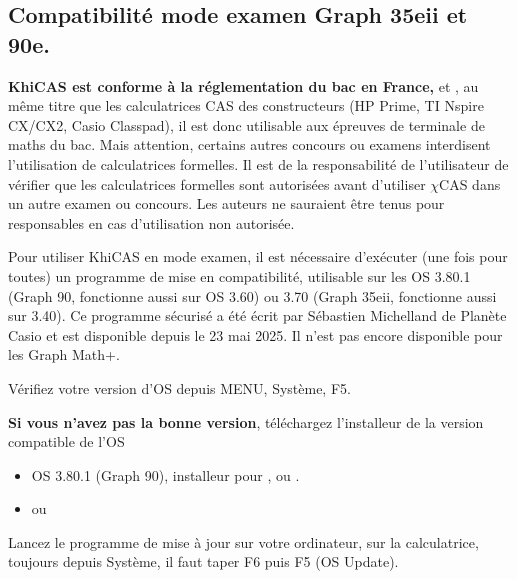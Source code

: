 \documentclass{article}
\begin{document}
\begin{giacjshere}
\subsection{Compatibilité mode examen Graph 35eii et 90e.}
{\bf KhiCAS est conforme à la réglementation du bac en France,
} et
,
au même titre que les calculatrices CAS des constructeurs 
(HP Prime, TI Nspire CX/CX2, Casio Classpad), il est donc utilisable
aux épreuves de terminale de maths du bac. 
Mais attention, certains autres
concours ou examens interdisent l'utilisation
de calculatrices formelles. Il est de la responsabilit\'e de l'utilisateur
de v\'erifier que les calculatrices formelles sont autoris\'ees
avant d'utiliser $\chi$CAS dans un autre examen ou concours. Les auteurs
ne sauraient \^etre tenus pour responsables en cas d'utilisation
non autoris\'ee.

Pour utiliser KhiCAS en mode examen, il est nécessaire
d'exécuter (une fois pour toutes) un programme de mise en compatibilité,
utilisable sur les OS 3.80.1 (Graph 90, fonctionne aussi sur OS 3.60) 
ou 3.70 (Graph 35eii, fonctionne aussi sur 3.40). 
Ce programme sécurisé a été écrit par Sébastien Michelland de Planète Casio 
et est disponible depuis le 23 mai 2025. Il n'est pas encore disponible
pour les Graph Math+.

Vérifiez votre version d'OS depuis MENU, Système, F5. 

{\bf Si vous n'avez pas la bonne version},
téléchargez l'installeur de la version compatible de l'OS
\begin{itemize}
\item 
OS 3.80.1 (Graph 90), installeur pour
,
ou .
\item
{} ou
\end{itemize}
Lancez le programme de mise à jour sur votre ordinateur, sur la calculatrice,
toujours depuis Système, il faut taper F6 puis F5 (OS Update).


\end{giacjshere}
\end{document}
